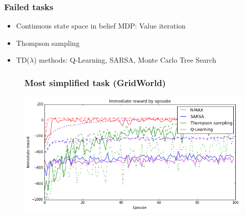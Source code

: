 \documentclass[10pt, compress]{beamer}
\begin{document}
\begin{frame}[fragile]
  \frametitle{Failed tasks}

  \begin{itemize}
  \item Continuous state space in belief MDP: Value iteration
  \item Thompson sampling
  \item TD($\lambda$) methods: Q-Learning, SARSA, Monte Carlo Tree Search
  \end{itemize}
\end{frame}

\begin{frame}
\begin{figure}[ht]
  \frametitle{Most simplified task (GridWorld)}
  \vspace{3ex}
  \begin{center}
  \centerline{\includegraphics[width=1.1\textwidth]{img/mdp_imm_rewards.png}}
  \end{center}
  \end{figure}
\end{frame}

\end{document}
